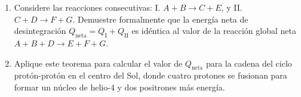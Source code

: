 \item \begin{enumerate}
    \item Considere las reacciones consecutivas: I. $A + B \to C + E$, y II. $C + D \to F + G$. Demuestre formalmente que la energía neta de desintegración $Q_{\text{neta}} = Q_{\text{I}} + Q_{\text{II}}$ es idéntica al valor de la reacción global neta $A + B + D \to E + F + G$.
    \item Aplique este teorema para calcular el valor de $Q_{\text{neta}}$ para la cadena del ciclo protón-protón en el centro del Sol, donde cuatro protones se fusionan para formar un núcleo de helio-4 y dos positrones más energía.
\end{enumerate}